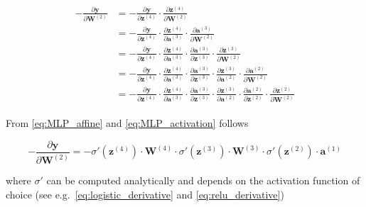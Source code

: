 \begin{align}\label{eq:backprop_step2}
\begin{split}
    -\frac{\partial\mathbf{y}}{\partial \mathbf{W}^{(2)}} &=
        -\frac{\partial \mathbf{y}}     {\partial \mathbf{z}^{(4)}} \cdot
        \frac{\partial \mathbf{z}^{(4)}}{\partial \mathbf{W}^{(2)}} \\
    &= -\frac{\partial \mathbf{y}}      {\partial \mathbf{z}^{(4)}} \cdot
        \frac{\partial \mathbf{z}^{(4)}}{\partial \mathbf{a}^{(3)}} \cdot
        \frac{\partial \mathbf{a}^{(3)}}{\partial \mathbf{W}^{(2)}} \\
    &= -\frac{\partial \mathbf{y}}      {\partial \mathbf{z}^{(4)}} \cdot
        \frac{\partial \mathbf{z}^{(4)}}{\partial \mathbf{a}^{(3)}} \cdot
        \frac{\partial \mathbf{a}^{(3)}}{\partial \mathbf{z}^{(3)}} \cdot
        \frac{\partial \mathbf{z}^{(3)}}{\partial \mathbf{W}^{(2)}} \\
    &= -\frac{\partial \mathbf{y}}      {\partial \mathbf{z}^{(4)}} \cdot
        \frac{\partial \mathbf{z}^{(4)}}{\partial \mathbf{a}^{(3)}} \cdot
        \frac{\partial \mathbf{a}^{(3)}}{\partial \mathbf{z}^{(3)}} \cdot
        \frac{\partial \mathbf{z}^{(3)}}{\partial \mathbf{a}^{(2)}} \cdot
        \frac{\partial \mathbf{a}^{(2)}}{\partial \mathbf{W}^{(2)}} \\
    &= -\frac{\partial \mathbf{y}}      {\partial \mathbf{z}^{(4)}} \cdot
        \frac{\partial \mathbf{z}^{(4)}}{\partial \mathbf{a}^{(3)}} \cdot
        \frac{\partial \mathbf{a}^{(3)}}{\partial \mathbf{z}^{(3)}} \cdot
        \frac{\partial \mathbf{z}^{(3)}}{\partial \mathbf{a}^{(2)}} \cdot
        \frac{\partial \mathbf{a}^{(2)}}{\partial \mathbf{z}^{(2)}} \cdot
        \frac{\partial \mathbf{z}^{(2)}}{\partial \mathbf{W}^{(2)}}
\end{split}
\end{align}

\noindent From \autoref{eq:MLP_affine} and \autoref{eq:MLP_activation} follows

\begin{equation}\label{eq:backprop_step3}
    -\frac{\partial\mathbf{y}}{\partial \mathbf{W}^{(2)}} =
    -\sigma'(\mathbf{z}^{(4)}) \cdot
        \mathbf{W}^{(4)} \cdot
        \sigma'(\mathbf{z}^{(3)}) \cdot
        \mathbf{W}^{(3)} \cdot
        \sigma'(\mathbf{z}^{(2)}) \cdot
        \mathbf{a}^{(1)}
\end{equation}

\noindent where $\sigma'$ can be computed analytically and depends on the
activation function of choice (see e.g.~\autoref{eq:logistic_derivative} and
\autoref{eq:relu_derivative})

